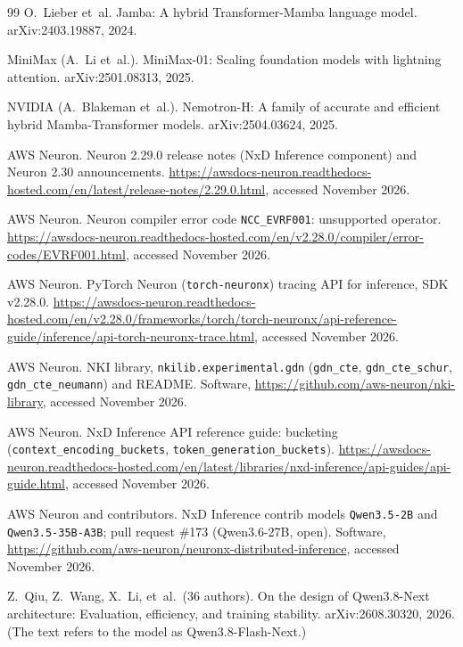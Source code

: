 \documentclass[11pt]{article}
\theoremstyle{remark}
\begin{document}
\begin{thebibliography}{99}
O.~Lieber et~al.
\newblock Jamba: A hybrid Transformer-Mamba language model.
\newblock arXiv:2403.19887, 2024.

MiniMax (A.~Li et~al.).
\newblock MiniMax-01: Scaling foundation models with lightning attention.
\newblock arXiv:2501.08313, 2025.

NVIDIA (A.~Blakeman et~al.).
\newblock Nemotron-H: A family of accurate and efficient hybrid Mamba-Transformer models.
\newblock arXiv:2504.03624, 2025.

AWS Neuron.
\newblock Neuron 2.29.0 release notes (NxD Inference component) and Neuron 2.30 announcements.
\newblock \url{https://awsdocs-neuron.readthedocs-hosted.com/en/latest/release-notes/2.29.0.html}, accessed November 2026.

AWS Neuron.
\newblock Neuron compiler error code \texttt{NCC\_EVRF001}: unsupported operator.
\newblock \url{https://awsdocs-neuron.readthedocs-hosted.com/en/v2.28.0/compiler/error-codes/EVRF001.html}, accessed November 2026.

AWS Neuron.
\newblock PyTorch Neuron (\texttt{torch-neuronx}) tracing API for inference, SDK v2.28.0.
\newblock
\url{https://awsdocs-neuron.readthedocs-hosted.com/en/v2.28.0/frameworks/torch/torch-neuronx/api-reference-guide/inference/api-torch-neuronx-trace.html},
accessed November 2026.

AWS Neuron.
\newblock NKI library, \texttt{nkilib.experimental.gdn} (\texttt{gdn\_cte}, \texttt{gdn\_cte\_schur}, \texttt{gdn\_cte\_neumann}) and
README.
\newblock Software, \url{https://github.com/aws-neuron/nki-library}, accessed November 2026.

AWS Neuron.
\newblock NxD Inference API reference guide: bucketing (\texttt{context\_encoding\_buckets}, \texttt{token\_generation\_buckets}).
\newblock \url{https://awsdocs-neuron.readthedocs-hosted.com/en/latest/libraries/nxd-inference/api-guides/api-guide.html}, accessed
November 2026.

AWS Neuron and contributors.
\newblock NxD Inference contrib models \texttt{Qwen3.5-2B} and \texttt{Qwen3.5-35B-A3B}; pull request \#173 (Qwen3.6-27B, open).
\newblock Software, \url{https://github.com/aws-neuron/neuronx-distributed-inference}, accessed November 2026.

Z.~Qiu, Z.~Wang, X.~Li, et~al.\ (36 authors).
\newblock On the design of Qwen3.8-Next architecture: Evaluation, efficiency, and training stability.
\newblock arXiv:2608.30320, 2026. (The text refers to the model as Qwen3.8-Flash-Next.)


\end{thebibliography}
\end{document}
